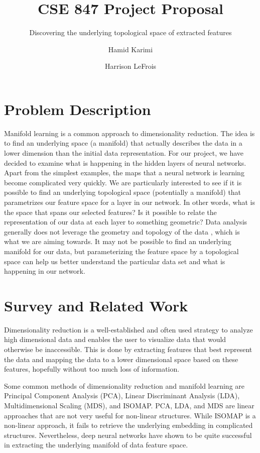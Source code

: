 \documentclass[sigconf]{acmart}
\title{CSE 847 Project Proposal}
\subtitle{Discovering the underlying topological space of extracted features}
\author{Hamid Karimi}
\affiliation{}
\author{Harrison LeFrois}
\affiliation{}
\begin{document}
	
	\maketitle
	\section{Problem Description}
	
	Manifold learning is a common approach to dimensionality reduction. The idea is to find an underlying space (a manifold) that actually describes the data in a lower dimension than the initial data representation. For our project, we have decided to examine what is happening in the hidden layers of neural networks. Apart from the simplest examples, the maps that a neural network is learning become complicated very quickly. We are particularly interested to see if it is possible to find an underlying topological space (potentially a manifold) that parametrizes our feature space for a layer in our network. In other words, what is the space that spans our selected features? Is it possible to relate the representation of our data at each layer to something geometric? Data analysis generally does not leverage the geometry and topology of the data \cite{bae}, which is what we are aiming towards. It may not be possible to find an underlying manifold for our data, but parameterizing the feature space by a topological space can help us better understand the particular data set and what is happening in our network.
	
	\section{Survey and Related Work}
	
	Dimensionality reduction is a well-established and often used strategy to analyze high dimensional data and enables the user to visualize data that would otherwise be inaccessible. This is done by extracting features that best represent the data and mapping the data to a lower dimensional space based on these features, hopefully without too much loss of information. 
	
	Some common methods of dimensionality reduction and manifold learning are Principal Component Analysis (PCA), Linear Discriminant Analysis (LDA), Multidimensional Scaling (MDS), and ISOMAP. PCA, LDA, and MDS are linear approaches that are not very useful for non-linear structures. While ISOMAP is a non-linear approach, it fails to retrieve the underlying embedding in complicated structures. Nevertheless, deep neural networks have shown to be quite successful in extracting the underlying manifold of data feature space. 
	
\end{document}
